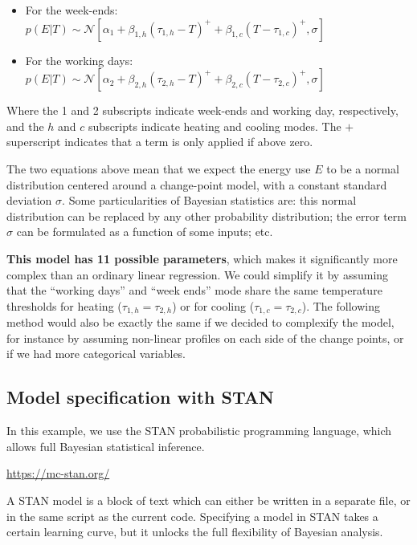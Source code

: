 \documentclass[
]{article}
\providecommand{\tightlist}{%
  \setlength{\itemsep}{0pt}\setlength{\parskip}{0pt}}
\begin{document}
\begin{itemize}
\tightlist
\item
  For the week-ends: \(p(E|T) \sim \mathcal{N}\left[\alpha_1 + \beta_{1,h}(\tau_{1,h}-T)^+ + \beta_{1,c}(T-\tau_{1,c})^+, \sigma\right]\)
\item
  For the working days: \(p(E|T) \sim \mathcal{N}\left[\alpha_2 + \beta_{2,h}(\tau_{2,h}-T)^+ + \beta_{2,c}(T-\tau_{2,c})^+,\sigma\right]\)
\end{itemize}

Where the 1 and 2 subscripts indicate week-ends and working day, respectively, and the \(h\) and \(c\) subscripts indicate heating and cooling modes. The \(+\) superscript indicates that a term is only applied if above zero.

The two equations above mean that we expect the energy use \(E\) to be a normal distribution centered around a change-point model, with a constant standard deviation \(\sigma\). Some particularities of Bayesian statistics are: this normal distribution can be replaced by any other probability distribution; the error term \(\sigma\) can be formulated as a function of some inputs; etc.

\textbf{This model has 11 possible parameters}, which makes it significantly more complex than an ordinary linear regression. We could simplify it by assuming that the ``working days'' and ``week ends'' mode share the same temperature thresholds for heating (\(\tau_{1,h}=\tau_{2,h}\)) or for cooling (\(\tau_{1,c}=\tau_{2,c}\)). The following method would also be exactly the same if we decided to complexify the model, for instance by assuming non-linear profiles on each side of the change points, or if we had more categorical variables.

\hypertarget{model-specification-with-stan}{%
\subsection{Model specification with STAN}\label{model-specification-with-stan}}

In this example, we use the STAN probabilistic programming language, which allows full Bayesian statistical inference.

\url{https://mc-stan.org/}

A STAN model is a block of text which can either be written in a separate file, or in the same script as the current code. Specifying a model in STAN takes a certain learning curve, but it unlocks the full flexibility of Bayesian analysis.
\end{document}
